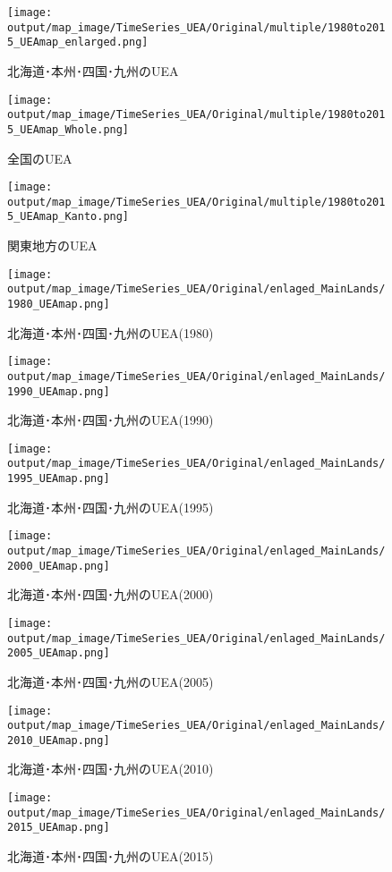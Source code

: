 \documentclass{ltjsarticle}
\begin{document}
\begin{figure}[pbth]
  \centering
  \texttt{[image: output/map\_image/TimeSeries\_UEA/Original/multiple/1980to2015\_UEAmap\_enlarged.png]}
  \caption{\label{ori:tsUEA:enl}北海道･本州･四国･九州のUEA}
\end{figure}

\begin{figure}[pbth]
  \centering
  \texttt{[image: output/map\_image/TimeSeries\_UEA/Original/multiple/1980to2015\_UEAmap\_Whole.png]}
  \caption{\label{ori:tsUEA:who}全国のUEA}
\end{figure}

\begin{figure}[pbth]
  \centering
  \texttt{[image: output/map\_image/TimeSeries\_UEA/Original/multiple/1980to2015\_UEAmap\_Kanto.png]}
  \caption{\label{ori:tsUEA:kan}関東地方のUEA}
\end{figure}

\begin{figure}[pbth]
  \centering
  \texttt{[image: output/map\_image/TimeSeries\_UEA/Original/enlaged\_MainLands/1980\_UEAmap.png]}
  \caption{\label{ori:1980UEA:enl}北海道･本州･四国･九州のUEA(1980)}
\end{figure}
\begin{figure}[pbth]
  \centering
  \texttt{[image: output/map\_image/TimeSeries\_UEA/Original/enlaged\_MainLands/1990\_UEAmap.png]}
  \caption{\label{ori:1990UEA:enl}北海道･本州･四国･九州のUEA(1990)}
\end{figure}
\begin{figure}[pbth]
  \centering
  \texttt{[image: output/map\_image/TimeSeries\_UEA/Original/enlaged\_MainLands/1995\_UEAmap.png]}
  \caption{\label{ori:1995UEA:enl}北海道･本州･四国･九州のUEA(1995)}
\end{figure}
\begin{figure}[pbth]
  \centering
  \texttt{[image: output/map\_image/TimeSeries\_UEA/Original/enlaged\_MainLands/2000\_UEAmap.png]}
  \caption{\label{ori:2000UEA:enl}北海道･本州･四国･九州のUEA(2000)}
\end{figure}
\begin{figure}[pbth]
  \centering
  \texttt{[image: output/map\_image/TimeSeries\_UEA/Original/enlaged\_MainLands/2005\_UEAmap.png]}
  \caption{\label{ori:2005UEA:enl}北海道･本州･四国･九州のUEA(2005)}
\end{figure}
\begin{figure}[pbth]
  \centering
  \texttt{[image: output/map\_image/TimeSeries\_UEA/Original/enlaged\_MainLands/2010\_UEAmap.png]}
  \caption{\label{ori:2010UEA:enl}北海道･本州･四国･九州のUEA(2010)}
\end{figure}
\begin{figure}[pbth]
  \centering
  \texttt{[image: output/map\_image/TimeSeries\_UEA/Original/enlaged\_MainLands/2015\_UEAmap.png]}
  \caption{\label{ori:2015UEA:enl}北海道･本州･四国･九州のUEA(2015)}
\end{figure}
\end{document}
